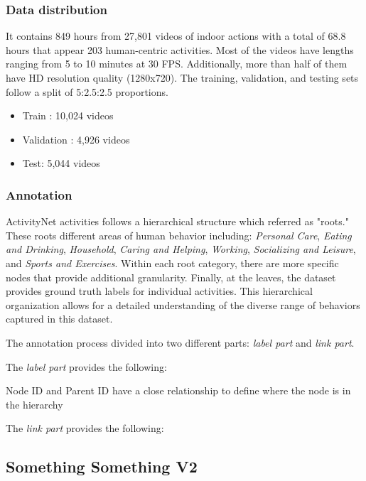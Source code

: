 \documentclass[10pt,onecolumn,letterpaper]{article}
\begin{document}
\subsubsection{Data distribution}
It contains 849 hours from 27,801 videos of indoor actions with a total of 68.8 hours that appear 203 human-centric activities. Most of the videos have lengths ranging from 5 to 10 minutes at 30 FPS. Additionally, more than half of them have HD resolution quality (1280x720). The training, validation, and testing sets follow a split of 5:2.5:2.5 proportions.
\begin{itemize}
	\item Train : 10,024 videos
	\item Validation : 4,926 videos
	\item Test: 5,044 videos 
\end{itemize}
\subsubsection{Annotation}
ActivityNet activities follows a hierarchical structure which referred as "roots." These roots different areas of human behavior including: \textit{Personal Care}, \textit{Eating and Drinking}, \textit{Household}, \textit{Caring and Helping}, \textit{Working}, \textit{Socializing and Leisure}, and \textit{Sports and Exercises}. Within each root category, there are more specific nodes that provide additional granularity. Finally, at the leaves, the dataset provides ground truth labels for individual activities. This hierarchical organization allows for a detailed understanding of the diverse range of behaviors captured in this dataset.

The annotation process divided into two different parts: \textit{label part} and \textit{link part}. 

The \textit{label part} provides the following:  

Node ID and Parent ID have a close relationship to define where the node is in the hierarchy

The \textit{link part} provides the following:
\subsection{Something Something V2}
\end{document}
